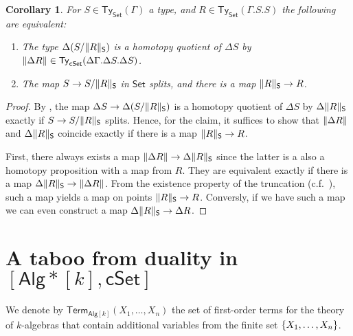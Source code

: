 \documentclass[10pt,a4paper]{article}
\newtheorem{corollary}[theorem]{Corollary}
\theoremstyle{definition}
\theoremstyle{remark}
\newcommand{\Set}{\mathsf{Set}}
\newcommand{\cSet}{\mathsf{cSet}}
\newcommand{\Alg}{\mathsf{Alg}}
\newcommand\Ty{\mathsf{Ty}}
\DeclarePairedDelimiter\set{\{}{\}}
\newcommand\Term{\mathsf{Term}}
\begin{document}
\begin{corollary}\label{prop:set-relevant-quotient-is-homotopy-quotient-iff-surjection-splits-and-witnesses-exist}
  For \(S \in \Ty_{\Set}(\Gamma)\) a type, and \(R \in \Ty_{\Set}(\Gamma.S.S)\) the following are equivalent:
  \begin{enumerate}[label=(\arabic*)]
    \item The type \(\Delta(S/\trunc*{R})\) is a homotopy quotient of \(\Delta S\) by \(\trunc{\Delta R} \in \Ty_{\cSet}(\Delta\Gamma.\Delta S. \Delta S)\).
    \item The map \(S \to S/\trunc*{R}\) in \(\Set\) splits, and there is a map \(\trunc*{R} \to R\).
  \end{enumerate}
\end{corollary}
\begin{proof}
  By , the map \(\Delta S \to \Delta(S/\trunc*{R})\) is a homotopy quotient of \(\Delta S\) by \(\Delta\trunc*{R}\) exactly if \(S \to S/\trunc*{R}\) splits.
  Hence, for the claim, it suffices to show that \(\trunc{\Delta R}\) and \(\Delta\trunc*{R}\) coincide exactly if there is a map \(\trunc*{R} \to R\).
  
  First, there always exists a map \(\trunc{\Delta R} \to \Delta\trunc*{R}\) since the latter is a also a homotopy proposition with a map from \(R\).
  They are equivalent exactly if there is a map \(\Delta\trunc*{R} \to \trunc{\Delta R}\).
  From the existence property of the truncation (c.f.~\cite[Section~8.3]{draft}), such a map yields a map on points \(\trunc*{R} \to R\).
  Conversly, if we have such a map we can even construct a map \(\Delta\trunc*{R} \to \Delta R\).
\end{proof}


\section{A taboo from duality in \texorpdfstring{\([\Alg*[k], \cSet]\)}{[k-Algᶠᵖ, cSet]}}\label{sec:k-duality-implies-k-alg-choice}

We denote by \(\Term_{\Alg[k]}(X_1, \ldots, X_n)\) the set of first-order terms for the theory of \(k\)-algebras that contain additional variables from the finite set \(\set{X_1, \ldots, X_n}\).
\end{document}
